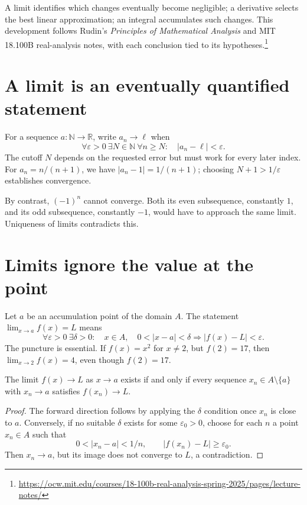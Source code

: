 
A limit identifies which changes eventually become negligible; a derivative selects the best linear approximation; an integral accumulates such changes. This development follows Rudin's \emph{Principles of Mathematical Analysis} and MIT 18.100B real-analysis notes, with each conclusion tied to its hypotheses.\footnote{\url{https://ocw.mit.edu/courses/18-100b-real-analysis-spring-2025/pages/lecture-notes/}}

\section{A limit is an eventually quantified statement}

For a sequence \(a:\mathbb N\to\mathbb R\), write \(a_n\to\ell\) when
\[
 \forall\varepsilon>0\ \exists N\in\mathbb N\
 \forall n\ge N:\quad |a_n-\ell|<\varepsilon.
\]
The cutoff \(N\) depends on the requested error but must work for every later index. For \(a_n=n/(n+1)\), we have \(|a_n-1|=1/(n+1)\); choosing \(N+1>1/\varepsilon\) establishes convergence.

By contrast, \((-1)^n\) cannot converge. Both its even subsequence, constantly \(1\), and its odd subsequence, constantly \(-1\), would have to approach the same limit. Uniqueness of limits contradicts this.

\section{Limits ignore the value at the point}

Let \(a\) be an accumulation point of the domain \(A\). The statement \(\lim_{x\to a}f(x)=L\) means
\[
 \forall\varepsilon>0\ \exists\delta>0:
 \quad x\in A,\quad 0<|x-a|<\delta
 \Longrightarrow |f(x)-L|<\varepsilon.
\]
The puncture is essential. If \(f(x)=x^2\) for \(x\ne2\), but \(f(2)=17\), then \(\lim_{x\to2}f(x)=4\), even though \(f(2)=17\).

\begin{theorem}
The limit \(f(x)\to L\) as \(x\to a\) exists if and only if every sequence \(x_n\in A\setminus\{a\}\) with \(x_n\to a\) satisfies \(f(x_n)\to L\).
\end{theorem}
\begin{proof}
The forward direction follows by applying the \(\delta\) condition once \(x_n\) is close to \(a\). Conversely, if no suitable \(\delta\) exists for some \(\varepsilon_0>0\), choose for each \(n\) a point \(x_n\in A\) such that
\[
 0<|x_n-a|<1/n,\qquad |f(x_n)-L|\ge\varepsilon_0.
\]
Then \(x_n\to a\), but its image does not converge to \(L\), a contradiction.
\end{proof}

